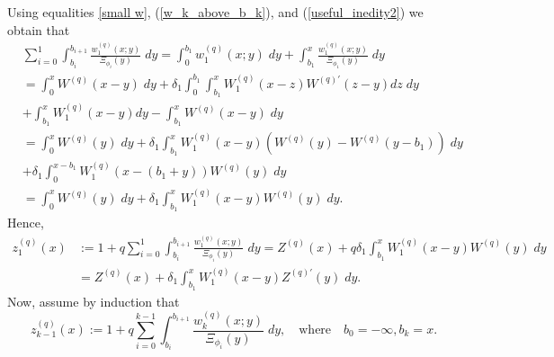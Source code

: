 \documentclass[12pt,reqno]{amsart}
\theoremstyle{definition}
\theoremstyle{remark}
\begin{document}
Using equalities \eqref{small w}, (\ref{w_k_above_b_k}), and (\ref{useful_inedity2}) we obtain that
\begin{align*}
&\sum_{i=0}^1
\int_{b_i}^{b_{i+1}}\frac{w_1^{(q)}(x;y)}{\Xi_{\phi_i}(y)}\;dy
=\int_0^{b_1}w_1^{(q)}(x;y)\;dy+\int_{b_1}^{x}\frac{w_1^{(q)}(x;y)}{\Xi_{\phi_1}(y)}\;dy\\
&=\int_0^{x}W^{(q)}(x-y)\;dy+ \delta_1 \int_0^{b_1} \int_{b_1}^{x} W_1^{(q)}(x-z)W^{(q)\prime}(z-y)dz \;dy \\ &
+\int_{b_1}^{x}W_1^{(q)}(x-y)dy - \int_{b_1}^{x}W^{(q)}(x-y)\;dy\\
&=\int_0^{x}W^{(q)}(y)\;dy +\delta_1\int_{b_1}^{x}W_1^{(q)}(x-y)\left(W^{(q)}(y)-W^{(q)}(y-b_1)\right)\;dy\\&+
\delta_1\int_{0}^{x-b_1}W_1^{(q)}\left(x-(b_1+y)\right)W^{(q)}(y)\;dy\\
&=\int_0^x W^{(q)}(y)\;dy+\delta_1\int_{b_1}^{x}W_1^{(q)}(x-y)W^{(q)}(y)\;dy.
\end{align*}
Hence,
\begin{align*}
z_1^{(q)}(x)&:=1+q\sum_{i=0}^1 \int_{b_i}^{b_{i+1}}\frac{w_1^{(q)}(x;y)}{\Xi_{\phi_i}(y)}\;dy
=Z^{(q)}(x)+q\delta_1\int_{b_1}^{x}W_1^{(q)}(x-y)W^{(q)}(y)\;dy\\
&=Z^{(q)}(x)+\delta_1\int_{b_1}^{x}W_1^{(q)}(x-y)Z^{(q)\prime}(y)\;dy.
\end{align*}
Now, assume by induction that
$$ z^{(q)}_{k-1}(x):=1+q\sum_{i=0}^{k-1}\int_{b_i}^{b_{i+1}}\frac{w_k^{(q)}(x;y)}{\Xi_{\phi_i}(y)}\;dy, \quad \textrm{where}
 \quad b_0=-\infty, b_{k}=x.  $$ 
\end{document}
